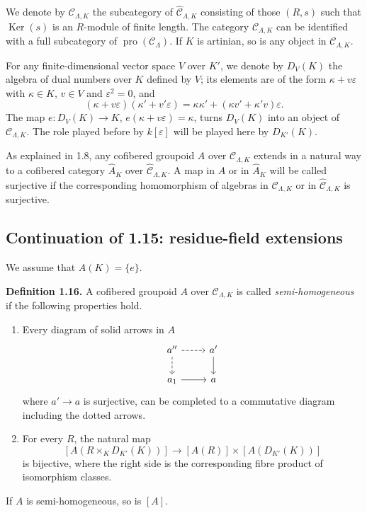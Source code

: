 \documentclass[11pt]{article}
\providecommand{\Ker}{\operatorname{Ker}}
\providecommand{\pro}{\operatorname{pro}}
\providecommand{\CL}{\mathcal C_\Lambda}
\providecommand{\CLK}{\mathcal C_{\Lambda,K}}
\begin{document}
We denote by $\CLK$ the subcategory of $\widehat{\mathcal C}_{\Lambda,K}$ consisting of those $(R,s)$ such that $\Ker(s)$ is an $R$-module of finite length. The category $\CLK$ can be identified with a full subcategory of $\pro(\CL)$. If $K$ is artinian, so is any object in $\CLK$.

For any finite-dimensional vector space $V$ over $K'$, we denote by $D_V(K)$ the algebra of dual numbers over $K$ defined by $V$; its elements are of the form $\kappa+v\varepsilon$ with $\kappa\in K$, $v\in V$ and $\varepsilon^2=0$, and
\[
 (\kappa+v\varepsilon)(\kappa'+v'\varepsilon)=\kappa\kappa'+(\kappa v'+\kappa'v)\varepsilon.
\]
The map $e:D_V(K)\to K$, $e(\kappa+v\varepsilon)=\kappa$, turns $D_V(K)$ into an object of $\CLK$. The role played before by $k[\varepsilon]$ will be played here by $D_{K'}(K)$.

As explained in 1.8, any cofibered groupoid $A$ over $\CLK$ extends in a natural way to a cofibered category $\widehat A_K$ over $\widehat{\mathcal C}_{\Lambda,K}$. A map in $A$ or in $\widehat A_K$ will be called surjective if the corresponding homomorphism of algebras in $\CLK$ or in $\widehat{\mathcal C}_{\Lambda,K}$ is surjective.




\providecommand{\Fl}{\operatorname{Fl}}
\providecommand{\coker}{\operatorname{coker}}
\providecommand{\Exal}{\operatorname{Exal}}


\subsection*{Continuation of 1.15: residue-field extensions}

We assume that \(A(K)=\{e\}\).

\textbf{Definition 1.16.} A cofibered groupoid \(A\) over \(\mathcal C_{\Lambda,K}\) is called
\emph{semi-homogeneous} if the following properties hold.

\begin{enumerate}[label=(\Roman*)]
\item Every diagram of solid arrows in \(A\)
\[
\begin{tikzcd}
a'' \arrow[r,dashed] \arrow[d,dashed] & a' \arrow[d]\\
a_1 \arrow[r] & a
\end{tikzcd}
\]
where \(a'\to a\) is surjective, can be completed to a commutative diagram including
the dotted arrows.

\item For every \(R\), the natural map
\[
 [A(R\times_K D_{K'}(K))]
 \longrightarrow
 [A(R)]\times [A(D_{K'}(K))]
\]
is bijective, where the right side is the corresponding fibre product of isomorphism
classes.
\end{enumerate}
If \(A\) is semi-homogeneous, so is \([A]\).
\end{document}
